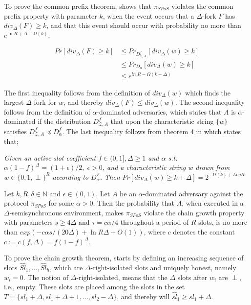 To prove the common prefix theorem, \cite{ouroboros-praos} shows that $\pi_{SPoS}$ violates the common prefix property with parameter $k$, when the event occurs that a $\Delta$-fork $F$ has $div_{\Delta}(F) \geq k$, and that this event should occur with probability no more than $e^{\ln R + \Delta - \Omega(k)}$. 

\begin{align*}
    Pr[div_{\Delta}(F) \geq k] &\leq Pr_{D^f_{\mathcal{Z},A}}[div_{\Delta}(w) \geq k]\\
                        &\leq Pr_{D_{\alpha}}[div_{\Delta}(w) \geq k]\\
                        &\leq e^{ln \; R - \Omega(k-\Delta)}
\end{align*}

The first inequality follows from the definition of $div_{\Delta}(w)$ which finds the largest $\Delta$-fork for $w$, and thereby $div_{\Delta}(F) \leq div_{\Delta}(w)$. The second inequality follows from the definition of $\alpha$-dominated adversaries, which states that $A$ is $\alpha$-dominated if the distribution $D^f_{\mathcal{Z},A}$ that upon the characteristic string $\{w\}$ satisfies $D^f_{\mathcal{Z},A} \preceq D^f_{\alpha}$. The last inequality follows from theorem 4 in \cite{ouroboros-praos} which states that; 



\emph{Given an \emph{active slot coefficient} $f \in (0,1], \Delta \geq 1$ and $\alpha$ s.t. $\alpha(1-f)^{\Delta} = (1+\epsilon)/2, \; \epsilon > 0$, and a characteristic string $w$ drawn from $w \in \{0,1, \perp\}^R$ according to $D^F_{\alpha}$. Then $Pr[div_{\Delta}(w) \geq k + \Delta] = 2^{-\Omega(k)+Log R}$}

\begin{theorem}
    Let $k,R,\delta \in \mathbb{N}$ and $\epsilon \in (0,1)$. Let $A$ be an $\alpha$-dominated adversary against the protocol $\pi_{SPoS}$ for some $\alpha > 0$. Then the probability that $A$, when executed in a $\Delta$-semisynchronous environment, makes $\pi_{SPoS}$ violate the chain growth property with parameters $s \geq 4\Delta$ and $\tau = c\alpha/4$ throughout a period of $R$ slots, is no more than $exp(-c\alpha s/(20\Delta) + \ln R\Delta + O(1))$, where $c$ denotes the constant $c := c(f,\Delta) = f(1-f)^\Delta$. 
\end{theorem}

To prove the chain growth theorem, \cite{ouroboros-praos} starts by defining an increasing sequence of slots $\hat{Sl}_1,\dots,\hat{Sl}_h$, which are $\Delta$-right-isolated slots and uniquely honest, namely $w_i = 0$. The notion of $\Delta$-right-isolated, means that the $\Delta$ slots after $w_i$ are $\perp$, i.e., empty. These slots are placed among the slots in the set $T = \{sl_1+\Delta, sl_1+\Delta+1, \dots, sl_2-\Delta\}$, and thereby will $\hat{sl}_1 \geq sl_1+\Delta$.

